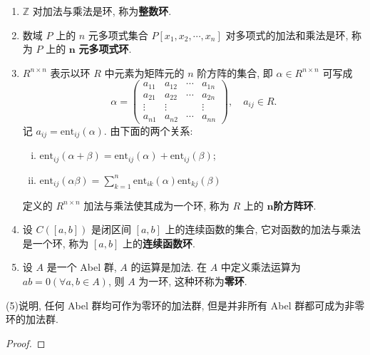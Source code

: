\documentclass[../../main.tex]{subfiles}%
\begin{document}
\begin{example}
\begin{enumerate}[(1)]
\item \( \mathbb{Z} \) 对加法与乘法是环, 称为\textbf{整数环}.

\item 数域 \( P \) 上的 \( n \) 元多项式集合 \( P[x_1,x_2,\cdots,x_n] \) 对多项式的加法和乘法是环, 称为 \( P \) 上的 \( \boldsymbol{n} \) \textbf{元多项式环}. 

\item \( R^{n \times n} \) 表示以环 \( R \) 中元素为矩阵元的 \( n \) 阶方阵的集合, 即 \( \alpha \in R^{n \times n} \) 可写成
\[
\alpha = \begin{pmatrix}
a_{11} & a_{12} & \cdots & a_{1n} \\
a_{21} & a_{22} & \cdots & a_{2n} \\
\vdots & \vdots & & \vdots \\
a_{n1} & a_{n2} & \cdots & a_{nn}
\end{pmatrix}, \quad a_{ij} \in R.
\]
记 \( a_{ij} = \text{ent}_{ij}(\alpha) \). 由下面的两个关系:
\begin{enumerate}[(i)]
\item \( \text{ent}_{ij}(\alpha + \beta) = \text{ent}_{ij}(\alpha) + \text{ent}_{ij}(\beta) \);
\item \( \text{ent}_{ij}(\alpha\beta) = \sum_{k=1}^n \text{ent}_{ik}(\alpha)\text{ent}_{kj}(\beta) \)
\end{enumerate}
定义的 \( R^{n \times n} \) 加法与乘法使其成为一个环, 称为 \( R \) 上的 \(\boldsymbol{n}\)\textbf{阶方阵环}.

\item 设 \( C([a,b]) \) 是闭区间 \([a,b]\) 上的连续函数的集合, 它对函数的加法与乘法是一个环, 称为 \([a,b]\) 上的\textbf{连续函数环}.

\item 设 \( A \) 是一个 Abel 群, \( A \) 的运算是加法. 在 \( A \) 中定义乘法运算为 \( ab = 0 (\forall a,b \in A) \), 则 \( A \) 为一环, 这种环称为\textbf{零环}.
\end{enumerate}
\end{example}
\begin{remark}
(5)说明, 任何 Abel 群均可作为零环的加法群, 但是并非所有 Abel 群都可成为非零环的加法群.
\end{remark}
\begin{proof}

\end{proof}
\end{document}
